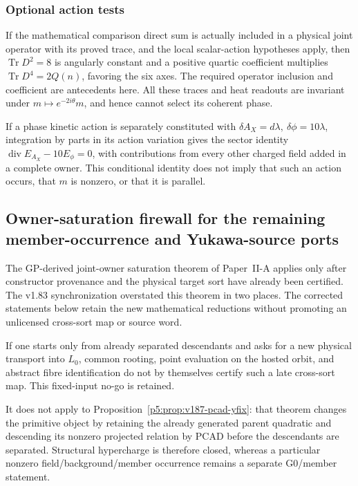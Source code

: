 \documentclass[12pt,a4paper]{article}
\begin{document}
\subsubsection{Optional action tests}
\label{p5:app:optional-comparison-action-tests}
If the mathematical comparison direct sum is actually
included in a physical joint operator with its proved trace,
and the local scalar-action hypotheses apply, then
\(\operatorname{Tr}D^2=8\) is angularly constant and
a positive quartic coefficient multiplies
\(\operatorname{Tr}D^4=2Q(n)\), favoring the six axes.
The required operator inclusion and coefficient are
antecedents here.  All these traces and heat readouts are
invariant under \(m\mapsto e^{-2i\theta}m\), and hence
cannot select its coherent phase.

If a phase kinetic action is separately constituted with
\(\delta A_X=d\lambda,\ \delta\phi=10\lambda\), integration
by parts in its action variation gives the sector identity
\(\operatorname{div}E_{A_X}-10E_\phi=0\), with contributions
from every other charged field added in a complete owner.
This conditional identity does not imply that such an
action occurs, that \(m\) is nonzero, or that it is parallel.



\subsection{Owner-saturation firewall for the remaining member-occurrence and Yukawa-source ports}
\label{p5:sec:v184-owner-completion-correction}
The GP-derived joint-owner saturation theorem of Paper~II-A applies only after
constructor provenance and the physical target sort have already been
certified.  The v1.83 synchronization overstated this theorem in two places.
The corrected statements below retain the new mathematical reductions without
promoting an unlicensed cross-sort map or source word.

\begin{proposition}
\label{p5:prop:v184-yfix-port-firewall}
If one starts only from already separated descendants and asks for a new
physical transport into \(L_0\), common rooting, point evaluation on the
hosted orbit, and abstract fibre identification do not by themselves certify
such a late cross-sort map.  This fixed-input no-go is retained.

It does not apply to Proposition~\ref{p5:prop:v187-pcad-yfix}: that theorem
changes the primitive object by retaining the already generated parent
quadratic and descending its nonzero projected relation by PCAD before the
descendants are separated.  Structural hypercharge is therefore closed,
whereas a particular nonzero field/background/member occurrence remains a
separate G0/member statement.
\end{proposition}
\end{document}
